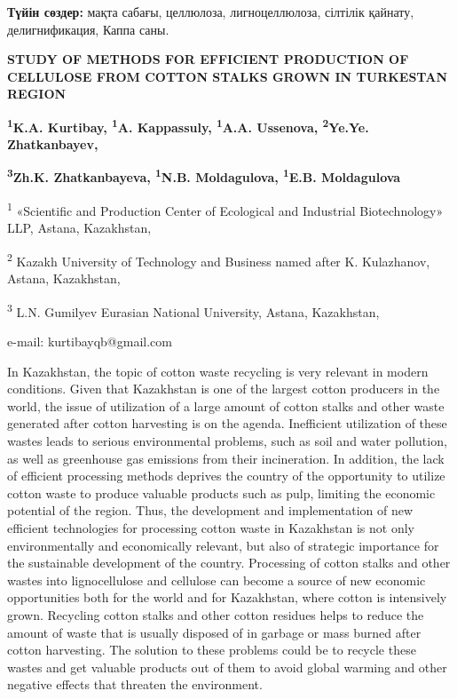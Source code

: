 {\bfseries Түйін сөздер:} мақта сабағы, целлюлоза, лигноцеллюлоза, сілтілік
қайнату, делигнификация, Каппа саны.

{\bfseries STUDY OF METHODS FOR EFFICIENT PRODUCTION OF CELLULOSE FROM
COTTON STALKS GROWN IN TURKESTAN REGION}

{\bfseries \textsuperscript{1}K.A. Kurtibay, \textsuperscript{1}A.
Kappassuly, \textsuperscript{1}A.A. Ussenova, \textsuperscript{2}Ye.Ye.
Zhatkanbayev,}

{\bfseries \textsuperscript{3}Zh.K. Zhatkanbayeva, \textsuperscript{1}N.B.
Moldagulova, \textsuperscript{1}E.B. Moldagulova}

\textsuperscript{1} «Scientific and Production Center of Ecological and
Industrial Biotechnology» LLP, Astana, Kazakhstan,

\textsuperscript{2} Kazakh University of Technology and Business named
after K. Kulazhanov, Astana, Kazakhstan,

\textsuperscript{3} L.N. Gumilyev Eurasian National University, Astana,
Kazakhstan,

e-mail: kurtibayqb@gmail.com

In Kazakhstan, the topic of cotton waste recycling is very relevant in
modern conditions. Given that Kazakhstan is one of the largest cotton
producers in the world, the issue of utilization of a large amount of
cotton stalks and other waste generated after cotton harvesting is on
the agenda. Inefficient utilization of these wastes leads to serious
environmental problems, such as soil and water pollution, as well as
greenhouse gas emissions from their incineration. In addition, the lack
of efficient processing methods deprives the country of the opportunity
to utilize cotton waste to produce valuable products such as pulp,
limiting the economic potential of the region. Thus, the development and
implementation of new efficient technologies for processing cotton waste
in Kazakhstan is not only environmentally and economically relevant, but
also of strategic importance for the sustainable development of the
country. Processing of cotton stalks and other wastes into
lignocellulose and cellulose can become a source of new economic
opportunities both for the world and for Kazakhstan, where cotton is
intensively grown. Recycling cotton stalks and other cotton residues
helps to reduce the amount of waste that is usually disposed of in
garbage or mass burned after cotton harvesting. The solution to these
problems could be to recycle these wastes and get valuable products out
of them to avoid global warming and other negative effects that threaten
the environment.

